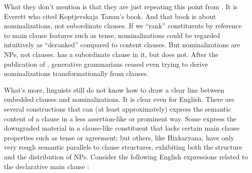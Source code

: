 \documentclass[output=paper,colorlinks,citecolor=brown
]{langscibook}
\begin{document}
What they don't mention is that they are just repeating this point
from \citet[629]{Everett05}. It is Everett who cited
Koptjevskaja Tamm's book. And that book is about nominalizations, not
subordinate clauses. If we ``rank'' constituents by reference to main
clause features such as tense, nominalizations could be regarded
intuitively as ``deranked'' compared to content clauses. But
nominalizations are NPs, not clauses.  has a subordinate clause in it, but
 does
not. After the publication of \citet{Chomsky70}, generative
grammarians ceased even trying to derive nominalizations
transformationally from clauses.

What's more, linguists still do not know how to draw a clear line between
embedded clauses and nominalizations. It is clear even for English.
There are several constructions that can (at least approximately)
express the semantic content of a clause in a less assertion-like
or prominent way.
Some express the downgraded material in a clause-like constituent
that lacks certain main clause properties such as tense or agreement;
but others, like Hixkaryana, have only very rough semantic parallels
to clause structures, exhibiting both the structure and the distribution
of NPs.  Consider the following English expressions related to the
declarative main clause :
\end{document}
